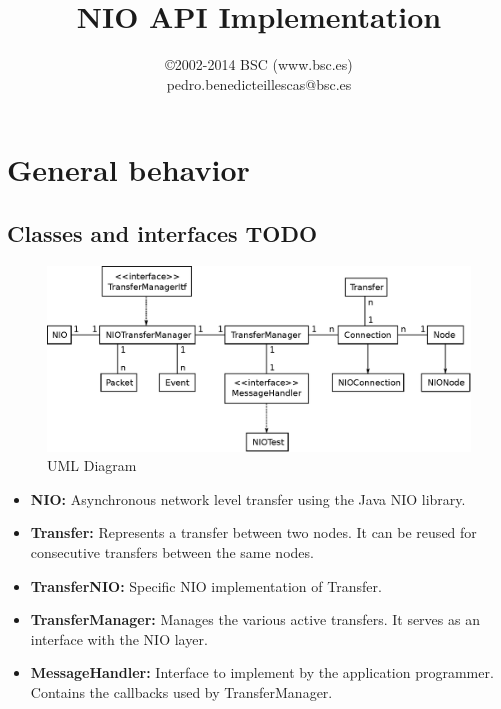 \documentclass[11pt]{article}
\title{\textbf{NIO API Implementation}}
\author{\copyright 2002-2014 BSC (www.bsc.es)\\pedro.benedicteillescas@bsc.es}
\date{}
\begin{document}
\maketitle

\section{General behavior}
\label{sec:general_behavior}

	\subsection{Classes and interfaces TODO}
		\begin{figure}[H]
		\centering
		\includegraphics[width=160mm]{img/drawing8.eps}
		\caption[UML Diagram]{UML Diagram}
		\label{drawing8}
		\end{figure}
	\begin{itemize}
		\item \textbf{NIO:}
			Asynchronous network level transfer using the Java NIO library.
		\item \textbf{Transfer:}
			Represents a transfer between two nodes. It can be reused for consecutive transfers between the same nodes.
		\item \textbf{TransferNIO:}
			Specific NIO implementation of Transfer.
		\item \textbf{TransferManager:}
			Manages the various active transfers. It serves as an interface with the NIO layer.
		\item \textbf{MessageHandler:}
			Interface to implement by the application programmer. Contains the callbacks used by TransferManager.
		\end{itemize}
\end{document}
